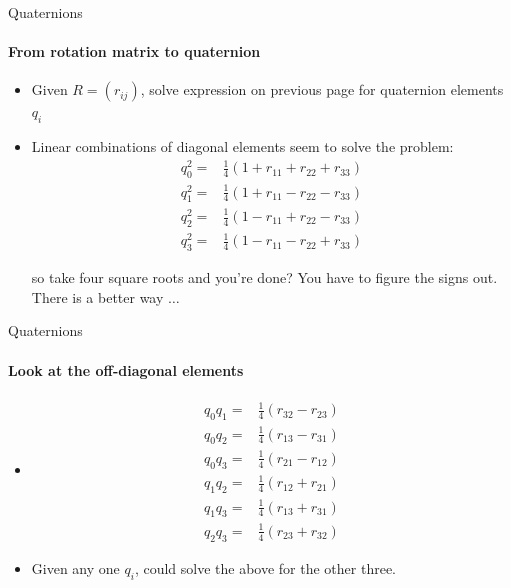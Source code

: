 \documentclass[aspectratio=169]{beamer}
\begin{document}
\begin{frame}{Quaternions}
    \framesubtitle{From rotation matrix to quaternion}

    \begin{itemize}
        \item Given $R = (r_{ij})$, solve expression on previous page for
              quaternion elements $q_i$
        \item Linear combinations of diagonal elements seem to solve the problem:
              \begin{align*}
                  q_0^2 = & \frac{1}{4} (1 + r_{11} + r_{22} + r_{33}) \\
                  q_1^2 = & \frac{1}{4} (1 + r_{11} - r_{22} - r_{33}) \\
                  q_2^2 = & \frac{1}{4} (1 - r_{11} + r_{22} - r_{33}) \\
                  q_3^2 = & \frac{1}{4} (1 - r_{11} - r_{22} + r_{33})
              \end{align*}

              so take four square roots and you're done?  You have to figure the
              signs out.  There is a better way $\ldots$
    \end{itemize}

\end{frame}

\begin{frame}{Quaternions}
    \framesubtitle{Look at the off-diagonal elements}
    \begin{itemize}
        \item[]
              \begin{align*}
                  q_0 q_1 = & \frac{1}{4}(r_{32} - r_{23}) \\
                  q_0 q_2 = & \frac{1}{4}(r_{13} - r_{31}) \\
                  q_0 q_3 = & \frac{1}{4}(r_{21} - r_{12}) \\
                  q_1 q_2 = & \frac{1}{4}(r_{12} + r_{21}) \\
                  q_1 q_3 = & \frac{1}{4}(r_{13} + r_{31}) \\
                  q_2 q_3 = & \frac{1}{4}(r_{23} + r_{32})
              \end{align*}

        \item[]  Given any one $q_i$, could solve the above for the other three.
    \end{itemize}
\end{frame}
\end{document}
